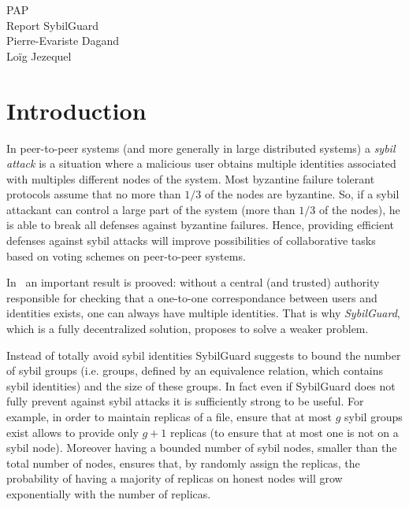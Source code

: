 \documentclass[a4paper,11pt]{article}
\begin{document}
\begin{center} 
  {\Large PAP \\ Report SybilGuard}\\
  Pierre-Evariste {\sc Dagand} \\
  Loïg {\sc Jezequel}
\end{center}

\section*{Introduction}


In peer-to-peer systems (and more generally in large distributed systems) a \emph{sybil attack} is a situation where a malicious user obtains multiple identities associated with multiples different nodes of the system.
Most byzantine failure tolerant protocols assume that no more than $1/3$ of the nodes are byzantine.
So, if a sybil attackant can control a large part of the system (more than $1/3$ of the nodes), he is able to break all defenses against byzantine failures.
Hence, providing efficient defenses against sybil attacks will improve possibilities of collaborative tasks based on voting schemes on peer-to-peer systems.


In~\cite{douceur} an important result is prooved: without a central (and trusted) authority responsible for checking that a one-to-one correspondance between users and identities exists, one can always have multiple identities.
That is why \emph{SybilGuard}, which is a fully decentralized solution, proposes to solve a weaker problem.


Instead of totally avoid sybil identities SybilGuard suggests to bound the number of sybil groups (i.e. groups, defined by an equivalence relation, which contains sybil identities) and the size of these groups.
In fact even if SybilGuard does not fully prevent against sybil attacks it is sufficiently strong to be useful.
For example, in order to maintain replicas of a file, ensure that at most $g$ sybil groups exist allows to provide only $g+1$ replicas (to ensure that at most one is not on a sybil node).
Moreover having a bounded number of sybil nodes, smaller than the total number of nodes, ensures that, by randomly assign the replicas, the probability of having a majority of replicas on honest nodes will grow exponentially with the number of replicas.
\end{document}
